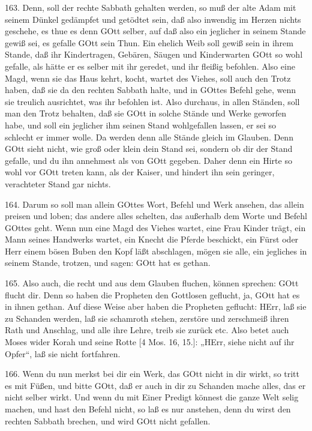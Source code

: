 163. Denn, soll der rechte Sabbath gehalten werden, so muß der alte Adam mit seinem Dünkel gedämpfet und getödtet sein, daß also inwendig im Herzen nichts geschehe, es thue es denn GOtt selber, auf daß also ein jeglicher in seinem Stande gewiß sei, es gefalle GOtt sein Thun. Ein ehelich Weib soll gewiß sein in ihrem Stande, daß ihr Kindertragen, Gebären, Säugen und Kinderwarten GOtt so wohl gefalle, als hätte er es selber mit ihr geredet, und ihr fleißig befohlen. Also eine Magd, wenn sie das Haus kehrt, kocht, wartet des Viehes, soll auch den Trotz haben, daß sie da den rechten Sabbath halte, und in GOttes Befehl gehe, wenn sie treulich ausrichtet, was ihr befohlen ist. Also durchaus, in allen Ständen, soll man den Trotz behalten, daß sie GOtt in solche Stände und Werke geworfen habe, und soll ein jeglicher ihm seinen Stand wohlgefallen lassen, er sei so schlecht er immer wolle. Da werden denn alle Stände gleich im Glauben. Denn GOtt sieht nicht, wie groß oder klein dein Stand sei, sondern ob dir der Stand gefalle, und du ihn annehmest als von GOtt gegeben. Daher denn ein Hirte so wohl vor GOtt treten kann, als
der Kaiser, und hindert ihn sein geringer, verachteter Stand gar nichts.

164. Darum so soll man allein GOttes Wort, Befehl und Werk ansehen, das allein preisen und loben; das andere alles schelten, das außerhalb dem Worte und Befehl GOttes geht. Wenn nun eine Magd des Viehes wartet, eine Frau Kinder trägt, ein Mann seines Handwerks wartet, ein Knecht die Pferde beschickt, ein Fürst oder Herr einem bösen Buben den Kopf läßt abschlagen, mögen sie alle, ein jegliches in seinem Stande, trotzen, und sagen: GOtt hat es gethan.

165. Also auch, die recht und aus dem Glauben fluchen, können sprechen: GOtt flucht dir. Denn so haben die Propheten den Gottlosen geflucht, ja, GOtt hat es in ihnen gethan. Auf diese Weise aber haben die Propheten geflucht: HErr, laß sie zu Schanden werden, laß sie schamroth stehen, zerstöre und zerschmeiß ihren Rath und Anschlag, und alle ihre Lehre, treib sie zurück etc. Also betet auch Moses wider Korah und seine Rotte [4 Mos. 16, 15.]: „HErr, siehe nicht auf ihr Opfer“, laß sie nicht fortfahren.

166. Wenn du nun merkst bei dir ein Werk, das GOtt nicht in dir wirkt, so tritt es mit Füßen, und bitte GOtt, daß er auch in dir zu Schanden mache alles, das er nicht selber wirkt. Und wenn du mit Einer Predigt könnest die ganze Welt selig machen, und hast den Befehl nicht, so laß es nur anstehen, denn du wirst den rechten Sabbath brechen, und wird GOtt nicht gefallen.

